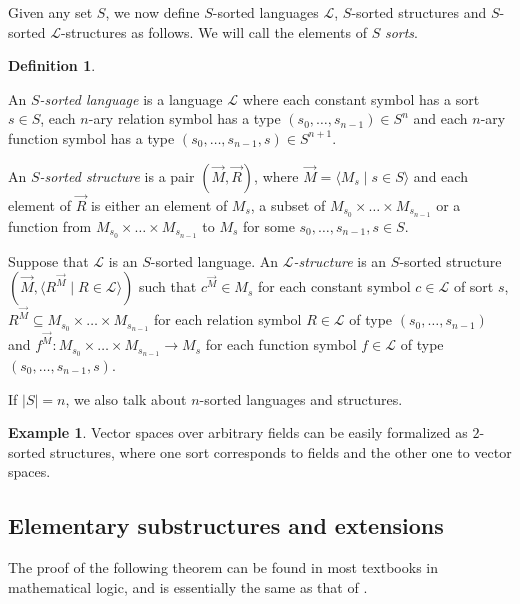 \documentclass[10pt]{amsart}
\renewcommand{\L}{\mathcal{L}}
\theoremstyle{definition}
\newtheorem{definition}[theorem]{Definition}
\newtheorem{example}[theorem]{Example}
\theoremstyle{remark}
\newenvironment{enumerate-(a)}{\begin{enumerate}[label={\upshape (\alph*)}, leftmargin=2pc]}{\end{enumerate}}
\begin{document}
Given any set $S$, we now define $S$-sorted languages $\L$, $S$-sorted structures and $S$-sorted $\L$-structures as follows. We will call the elements of $S$ \emph{sorts}. 

\begin{definition} 
\begin{enumerate-(a)} 
\item 
An \emph{$S$-sorted language} is a language $\L$ where each constant symbol has a sort $s\in S$, each $n$-ary relation symbol has a type $(s_0,\dots,s_{n-1})\in S^n$ and each $n$-ary function symbol has a type $(s_0,\dots,s_{n-1},s)\in S^{n+1}$. 
\item 
An \emph{$S$-sorted structure} is a pair $(\vec{M},\vec{R})$, where $\vec{M}=\langle M_s\mid s\in S\rangle$ and each element of $\vec{R}$ is either an element of $M_s$, a subset of $M_{s_0}\times \dots \times M_{s_{n-1}}$ or a function from $M_{s_0}\times \dots \times M_{s_{n-1}}$ to $M_s$ for some $s_0,\dots,s_{n-1},s\in S$. 
\item
Suppose that $\L$ is an $S$-sorted language. An \emph{$\L$-structure} is an $S$-sorted structure $(\vec{M},\langle R^{\vec{M}}\mid R\in\L\rangle)$ such that $c^{\vec{M}}\in M_s$ for each constant symbol $c\in\L$ of sort $s$, $R^{\vec{M}}\subseteq M_{s_0}\times \dots \times M_{s_{n-1}}$ for each relation symbol $R\in\L$ of type $(s_0,\dots,s_{n-1})$ and $f^{\vec{M}}\colon M_{s_0}\times \dots \times M_{s_{n-1}}\rightarrow M_s$ for each function symbol $f\in\L$ of type $(s_0,\dots,s_{n-1},s)$. 
\end{enumerate-(a)} 
\end{definition} 

If $|S|=n$, we also talk about $n$-sorted languages and structures. 

\begin{example} 
Vector spaces over arbitrary fields can be easily formalized as $2$-sorted structures, where one sort corresponds to fields and the other one to vector spaces. 
\end{example} 




\subsection{Elementary substructures and extensions} 

The proof of the following theorem can be found in most textbooks in mathematical logic, and is essentially the same as that of \cite[Theorem 2.2.1]{MR2908005}. 
\end{document}
